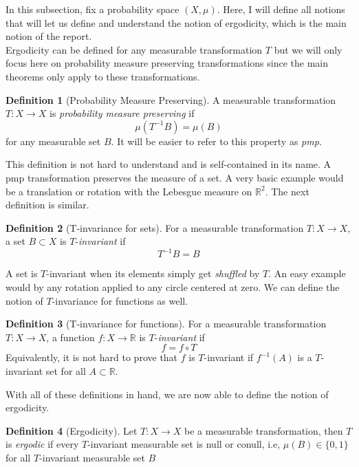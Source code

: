 \documentclass{article}
\theoremstyle{definition}
\newtheorem{definition}{Definition}[section]
\begin{document}
In this subsection, fix a probability space $(X, \mu)$. Here, I will define all notions that will let us define and understand the notion of ergodicity, which is the main notion of the report. \\
Ergodicity can be defined for any measurable transformation $T$ but we will only focus here on probability measure preserving transformations since the main theorems only apply to these transformations.

\begin{definition}[Probability Measure Preserving]
A measurable transformation $T:X\to X$ is \textit{probability measure preserving} if $$\mu(T^{-1}B)=\mu(B)$$ for any measurable set $B$. It will be easier to refer to this property as \textit{pmp}.\\
\end{definition}

This definition is not hard to understand and is self-contained in its name. A pmp transformation preserves the measure of a set. A very basic example would be a translation or rotation with the Lebesgue measure on $\mathbb{R}^2$. The next definition is similar.

\begin{definition}[T-invariance for sets]
    For a measurable transformation $T:X\to X$, a set $B\subset X$ is $T$-\textit{invariant} if $$T^{-1}B=B$$
\end{definition}

A set is $T$-invariant when its elements simply get \textit{shuffled} by $T$. An easy example would by any rotation applied to any circle centered at zero. We can define the notion of $T$-invariance for functions as well.

\begin{definition}[T-invariance for functions]
    For a measurable transformation $T:X\to X$, a function $f:X\to \mathbb{R}$ is $T$-\textit{invariant} if $$f=f\circ T$$ Equivalently, it is not hard to prove that $f$ is $T$-invariant if $f^{-1}(A)$ is a $T$-invariant set for all $A \subset \mathbb{R}$.
\end{definition}

With all of these definitions in hand, we are now able to define the notion of ergodicity. 

\begin{definition}[Ergodicity]
    Let $T:X\to X$ be a measurable transformation, then $T$ is \textit{ergodic} if every $T$-invariant measurable set is null or conull, i.e, $\mu(B) \in \{0,1\}$ for all $T$-invariant measurable set $B$
\end{definition}
\end{document}
